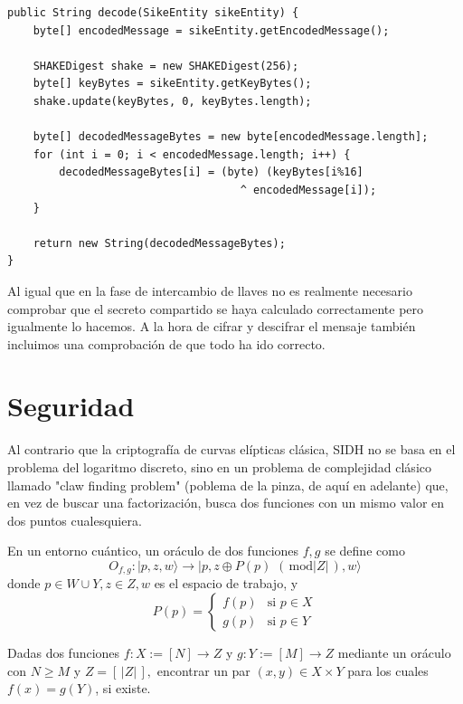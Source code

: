 \begin{verbatim}
public String decode(SikeEntity sikeEntity) {
    byte[] encodedMessage = sikeEntity.getEncodedMessage();

    SHAKEDigest shake = new SHAKEDigest(256);
    byte[] keyBytes = sikeEntity.getKeyBytes();
    shake.update(keyBytes, 0, keyBytes.length);

    byte[] decodedMessageBytes = new byte[encodedMessage.length];
    for (int i = 0; i < encodedMessage.length; i++) {
        decodedMessageBytes[i] = (byte) (keyBytes[i%16] 
                                    ^ encodedMessage[i]);
    }

    return new String(decodedMessageBytes);
}
\end{verbatim}

Al igual que en la fase de intercambio de llaves no es realmente necesario comprobar que el secreto compartido se haya calculado correctamente pero igualmente lo hacemos. A la hora de cifrar y descifrar el mensaje también incluimos una comprobación de que todo ha ido correcto.

%
%

\section{Seguridad}

Al contrario que la criptografía de curvas elípticas clásica, SIDH no se basa en el problema del logaritmo discreto, sino en un problema de complejidad clásico llamado "claw finding problem" (poblema de la pinza, de aquí en adelante) que, en vez de buscar una factorización, busca dos funciones con un mismo valor en dos puntos cualesquiera.

\begin{definition}
    En un entorno cuántico, un oráculo de dos funciones $f,g$ se define como
    \[ O_{f,g}: |p,z,w\rangle \to |p,z\oplus P(p)\,\,(\,\text{mod} |Z|\,),w\rangle \]
    donde $p\in W\cup Y, z\in Z,w$ es el espacio de trabajo, y
    \[ P(p) = \begin{cases}
       f(p) &\text{si } p \in X \\
       g(p) &\text{si } p \in Y
    \end{cases} \]
\end{definition}

\begin{problem}
    Dadas dos funciones $f:X:=[N] \to Z$ y $g:Y:=[M] \to Z$ mediante un oráculo con $N \geq M$ y $Z=[\,|Z|\,],$ encontrar un par $(x,y) \in X \times Y$ para los cuales $f(x) = g(Y)$, si existe. \cite{claw-finding-algorithms}
\end{problem}

